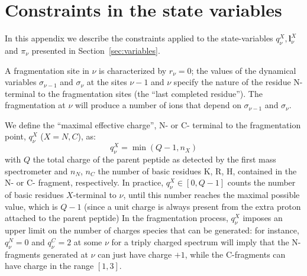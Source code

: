 \chapter{Constraints in the state variables}
\label{chap:app_constraints}

In this appendix we describe the constraints applied to the state-variables
$q_\nu^X,\bm l_\nu^X$ and $\pi_\nu$ presented in Section~\ref{sec:variables}.

A fragmentation site in $\nu$ is characterized by $r_\nu=0$; the  values of the dynamical variables
$\sigma_{\nu-1}$ and $\sigma_\nu$ at the sites $\nu-1$ and $\nu$ specify the nature of the residue N-terminal to the fragmentation sites (the ``last completed residue'').
The  fragmentation at $\nu$ will produce a number of ions that depend on $\sigma_{\nu-1}$ and $\sigma_\nu$. 

We define the ``maximal effective charge'', N- or C- terminal to the fragmentation point, 
$q^X_\nu$ ($X=N,C$), as:
\begin{equation}
q^X_\nu = \min(Q-1,n_X)
\end{equation}
with $Q$ the total charge of the parent peptide as detected by the first mass spectrometer and $n_N$, $n_C$ the number of basic residues K, R, H, contained in the N- or C- fragment, respectively.
In practice, $q^X_\nu \in [0,Q-1]$ counts the number of basic residues $X$-terminal to $\nu$, until this number reaches the maximal possible value, which is $Q-1$ (since a unit charge is always present from the extra proton attached to the parent peptide) 
In the fragmentation process, $q^X_\nu$ imposes an upper limit on the number of charges species that can be generated:
for instance, $q^N_\nu =0$ and $q^C_\nu =2$ at some $\nu$  for a triply charged spectrum will imply that the N-fragments  generated at $\nu$ can just have charge $+1$, while the C-fragments can have charge in the range $[1,3]$. 

